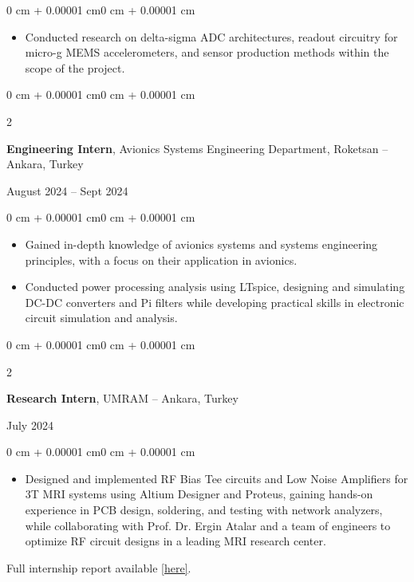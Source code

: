 \documentclass[10pt, letterpaper]{article}
\newenvironment{highlights}{
    \begin{itemize}[
        topsep=0.10 cm,
        parsep=0.10 cm,
        partopsep=0pt,
        itemsep=0pt,
        leftmargin=0 cm + 10pt
    ]
}{
    \end{itemize}
} %
\newenvironment{onecolentry}{
    \begin{adjustwidth}{0 cm + 0.00001 cm}{0 cm + 0.00001 cm}
}{
    \end{adjustwidth}
} %
\newenvironment{twocolentry}[2][]{
    \onecolentry
    \def\secondColumn{#2}
    \setcolumnwidth{\fill, 4.5 cm}
    \begin{paracol}{2}
}{
    \switchcolumn \raggedleft \secondColumn
    \end{paracol}
    \endonecolentry
} %
\begin{document}
\vspace{0.10 cm}
\begin{onecolentry}
    \begin{highlights}
        \item Conducted research on delta-sigma ADC architectures, readout circuitry for micro-g MEMS accelerometers, and sensor production methods within the scope of the project.
    \end{highlights}
\end{onecolentry}

\vspace{0.2 cm}
\begin{twocolentry}{August 2024 – Sept 2024}
    \textbf{Engineering Intern}, Avionics Systems Engineering Department, Roketsan -- Ankara, Turkey
\end{twocolentry}

\vspace{0.10 cm}
\begin{onecolentry}

    \begin{highlights}
        \item Gained in-depth knowledge of avionics systems and systems engineering principles, with a focus on their application in avionics.
        \item Conducted power processing analysis using LTspice, designing and simulating DC-DC converters and Pi filters while developing practical skills in electronic circuit simulation and analysis.
    \end{highlights}
\end{onecolentry}

\vspace{0.2 cm}
\begin{twocolentry}{July 2024}
    \textbf{Research Intern}, UMRAM -- Ankara, Turkey
\end{twocolentry}

\vspace{0.10 cm}
\begin{onecolentry}
    \begin{highlights}
        \item Designed and implemented RF Bias Tee circuits and Low Noise Amplifiers for 3T MRI systems using Altium Designer and Proteus, gaining hands-on experience in PCB design, soldering, and testing with network analyzers, while collaborating with Prof. Dr. Ergin Atalar and a team of engineers to optimize RF circuit designs in a leading MRI research center.
    \end{highlights}
    \vspace{0.1cm}
    Full internship report available \href{https://drive.google.com/file/d/1wPOYxnAS0WKuvXy8KdiaDvrH2BX0o-4U/view}{[here]}.
\end{onecolentry}
\end{document}
